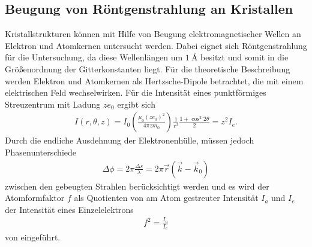 \subsection{Beugung von Röntgenstrahlung an Kristallen}
\label{subsec:Beugung}
Kristallstrukturen können mit Hilfe von Beugung
elektromagnetischer Wellen an Elektron und Atomkernen untersucht werden.
Dabei eignet sich Röntgenstrahlung für die Untersuchung, da diese Wellenlängen um
$\SI{1}{\angstrom}$ besitzt und somit in
die Größenordnung der Gitterkonstanten liegt.
Für die theoretische Beschreibung werden Elektron und Atomkernen
als Hertzsche-Dipole betrachtet, die mit einem
elektrischen Feld wechselwirken.
Für die Intensität eines punktförmiges Streuzentrum mit
Ladung $ze_0$ ergibt sich
\begin{align}
  I(r,\theta,z) = I_0\left(\frac{\mu_0 (ze_0)^2}{4\pi zm_0}\right)\frac{1}{r^2}\frac{1+\cos^2 2\theta}{2}=z^2 I_e \label{6}.
\end{align}
Durch die endliche Ausdehnung der Elektronenhülle,
müssen jedoch Phasenunterschiede
\begin{align*}
  \Delta\phi=2\pi\frac{\Delta s}{\lambda}= 2\pi\vec{r}\left(\vec{k}-\vec{k}_0\right)
\end{align*}
zwischen den gebeugten
Strahlen berücksichtigt werden und es wird
der Atomformfaktor $f$ als Quotienten
von am Atom gestreuter Intensität $I_a$ und $I_e$ der
Intensität eines Einzelelektrons
\begin{align}
f^2=\frac{I_a}{I_e}
\end{align}
von eingeführt.

